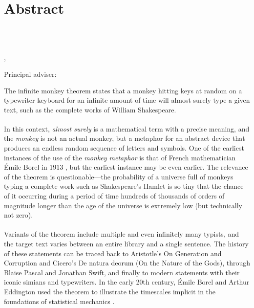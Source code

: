 \chapter*{Abstract} \label{abstract}

\begin{center}\large
    \textbf{\thesisTitle}\\
\end{center}

\begin{center}
\end{center}

\begin{center}
    \authorName\\
    \schoolName, \thesisYear\\
\end{center}

\begin{center}
    Principal adviser: \firstAdvisorName\\
\end{center}


\begin{center}
\end{center}


The infinite monkey theorem states that a monkey hitting keys at random on a typewriter keyboard for an infinite amount of time will almost surely type a given text, such as the complete works of William Shakespeare.
\\
\\
In this context, \textit{almost surely} is a mathematical term with a precise meaning, and the \textit{monkey} is not an actual monkey, but a metaphor for an abstract device that produces an endless random sequence of letters and symbols. One of the earliest instances of the use of the \textit{monkey metaphor} is that of French mathematician Émile Borel in 1913 \cite{borel1913mecanique}, but the earliest instance may be even earlier. The relevance of the theorem is questionable—the probability of a universe full of monkeys typing a complete work such as Shakespeare's Hamlet is so tiny that the chance of it occurring during a period of time hundreds of thousands of orders of magnitude longer than the age of the universe is extremely low (but technically not zero).
\\
\\
Variants of the theorem include multiple and even infinitely many typists, and the target text varies between an entire library and a single sentence. The history of these statements can be traced back to Aristotle's On Generation and Corruption and Cicero's De natura deorum (On the Nature of the Gods), through Blaise Pascal and Jonathan Swift, and finally to modern statements with their iconic simians and typewriters. In the early 20th century, Émile Borel and Arthur Eddington used the theorem to illustrate the timescales implicit in the foundations of statistical mechanics \cite{wikiMonkeys}.

